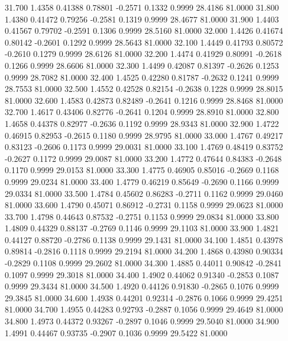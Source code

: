   31.700   1.4358   0.41388   0.78801  -0.2571   0.1332   0.9999  28.4186  81.0000
  31.800   1.4380   0.41472   0.79256  -0.2581   0.1319   0.9999  28.4677  81.0000
  31.900   1.4403   0.41567   0.79702  -0.2591   0.1306   0.9999  28.5160  81.0000
  32.000   1.4426   0.41674   0.80142  -0.2601   0.1292   0.9999  28.5643  81.0000
  32.100   1.4449   0.41793   0.80572  -0.2610   0.1279   0.9999  28.6126  81.0000
  32.200   1.4474   0.41929   0.80991  -0.2618   0.1266   0.9999  28.6606  81.0000
  32.300   1.4499   0.42087   0.81397  -0.2626   0.1253   0.9999  28.7082  81.0000
  32.400   1.4525   0.42280   0.81787  -0.2632   0.1241   0.9999  28.7553  81.0000
  32.500   1.4552   0.42528   0.82154  -0.2638   0.1228   0.9999  28.8015  81.0000
  32.600   1.4583   0.42873   0.82489  -0.2641   0.1216   0.9999  28.8468  81.0000
  32.700   1.4617   0.43406   0.82776  -0.2641   0.1204   0.9999  28.8910  81.0000
  32.800   1.4658   0.44378   0.82977  -0.2636   0.1192   0.9999  28.9343  81.0000
  32.900   1.4722   0.46915   0.82953  -0.2615   0.1180   0.9999  28.9795  81.0000
  33.000   1.4767   0.49217   0.83123  -0.2606   0.1173   0.9999  29.0031  81.0000
  33.100   1.4769   0.48419   0.83752  -0.2627   0.1172   0.9999  29.0087  81.0000
  33.200   1.4772   0.47644   0.84383  -0.2648   0.1170   0.9999  29.0153  81.0000
  33.300   1.4775   0.46905   0.85016  -0.2669   0.1168   0.9999  29.0234  81.0000
  33.400   1.4779   0.46219   0.85649  -0.2690   0.1166   0.9999  29.0334  81.0000
  33.500   1.4784   0.45602   0.86283  -0.2711   0.1162   0.9999  29.0460  81.0000
  33.600   1.4790   0.45071   0.86912  -0.2731   0.1158   0.9999  29.0623  81.0000
  33.700   1.4798   0.44643   0.87532  -0.2751   0.1153   0.9999  29.0834  81.0000
  33.800   1.4809   0.44329   0.88137  -0.2769   0.1146   0.9999  29.1103  81.0000
  33.900   1.4821   0.44127   0.88720  -0.2786   0.1138   0.9999  29.1431  81.0000
  34.100   1.4851   0.43978   0.89814  -0.2816   0.1118   0.9999  29.2194  81.0000
  34.200   1.4868   0.43980   0.90334  -0.2829   0.1108   0.9999  29.2602  81.0000
  34.300   1.4885   0.44011   0.90842  -0.2841   0.1097   0.9999  29.3018  81.0000
  34.400   1.4902   0.44062   0.91340  -0.2853   0.1087   0.9999  29.3434  81.0000
  34.500   1.4920   0.44126   0.91830  -0.2865   0.1076   0.9999  29.3845  81.0000
  34.600   1.4938   0.44201   0.92314  -0.2876   0.1066   0.9999  29.4251  81.0000
  34.700   1.4955   0.44283   0.92793  -0.2887   0.1056   0.9999  29.4649  81.0000
  34.800   1.4973   0.44372   0.93267  -0.2897   0.1046   0.9999  29.5040  81.0000
  34.900   1.4991   0.44467   0.93735  -0.2907   0.1036   0.9999  29.5422  81.0000
